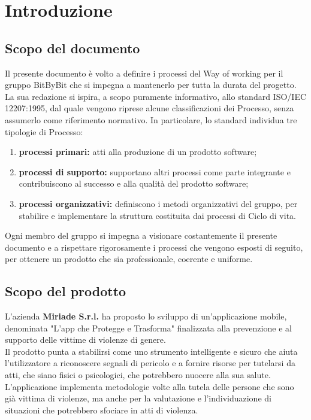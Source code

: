 \documentclass[a4paper,12pt]{article}
\begin{document}
\clearpage

\clearpage
\tableofcontents
\thispagestyle{empty} %
\clearpage

\listoftables
\thispagestyle{empty}
\clearpage

\section{Introduzione}
\subsection{Scopo del documento}
Il presente documento è volto a definire i processi del Way of working per il gruppo BitByBit che si impegna a mantenerlo per tutta la durata del progetto.
La sua redazione si ispira, a scopo puramente informativo, allo standard ISO/IEC 12207:1995, dal quale vengono riprese alcune classificazioni dei Processo, senza assumerlo come riferimento normativo. In particolare, lo standard individua tre tipologie di Processo:
\begin{enumerate}
    \item \textbf{processi primari:} atti alla produzione di un prodotto software;
    \item \textbf{processi di supporto:} supportano altri processi come parte integrante e contribuiscono al successo e alla qualità del prodotto software;
    \item \textbf{processi organizzativi:} definiscono i metodi organizzativi del gruppo, per stabilire e implementare la struttura costituita dai processi di Ciclo di vita.
\end{enumerate}
Ogni membro del gruppo si impegna a visionare costantemente il presente documento e a rispettare rigorosamente i processi che vengono esposti di seguito, per ottenere un prodotto che sia professionale, coerente e uniforme.

\subsection{Scopo del prodotto}
L'azienda \textbf{Miriade S.r.l.} ha proposto lo sviluppo di un'applicazione mobile, denominata "L'app che Protegge e Trasforma" finalizzata alla prevenzione e al supporto delle vittime di violenze di genere. \\Il prodotto punta a stabilirsi come uno strumento intelligente e sicuro che aiuta l'utilizzatore a riconoscere segnali di pericolo e a fornire risorse per tutelarsi da atti, che siano fisici o psicologici, che potrebbero nuocere alla sua salute. L'applicazione implementa metodologie volte alla tutela delle persone che sono già vittima di violenze, ma anche per la valutazione e l'individuazione di situazioni che potrebbero sfociare in atti di violenza.
\end{document}
